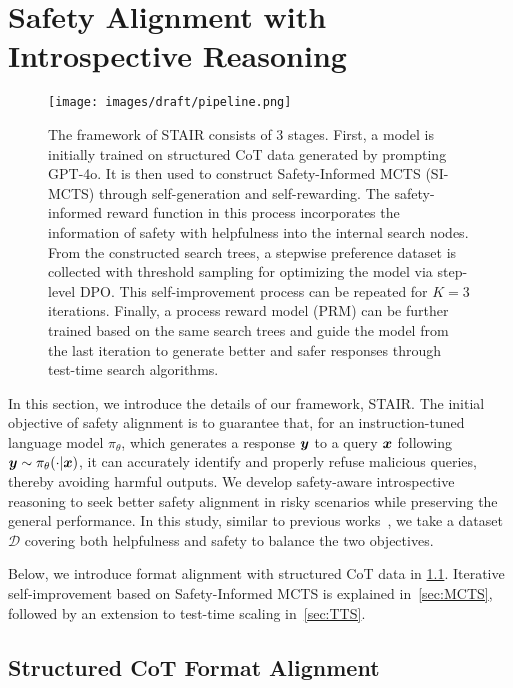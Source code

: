 \section{Safety Alignment with Introspective Reasoning}


\begin{figure*}
    \centering
    \texttt{[image: images/draft/pipeline.png]}
    \vspace{-3ex}
    \caption{The framework of STAIR consists of 3 stages. First, a model is initially trained on structured CoT data generated by prompting GPT-4o. It is then used to construct Safety-Informed MCTS (SI-MCTS) through self-generation and self-rewarding. The safety-informed reward function in this process incorporates the information of safety with helpfulness into the internal search nodes. From the constructed search trees, a stepwise preference dataset is collected with threshold sampling for optimizing the model via step-level DPO. This self-improvement process can be repeated for $K=3$ iterations. Finally, a process reward model (PRM) can be further trained based on the same search trees and guide the model from the last iteration to generate better and safer responses through test-time search algorithms.}
    \label{fig:framework}
\end{figure*}

In this section, we introduce the details of our framework, STAIR. The initial objective of safety alignment is to guarantee that, for an instruction-tuned language model $\pi_\theta$, which generates a response $\boldsymbol{y}$ to a query $\boldsymbol{x}$ following $\boldsymbol{y}\sim\pi_\theta(\cdot|\boldsymbol{x})$, it can accurately identify and properly refuse malicious queries, thereby avoiding harmful outputs. We develop safety-aware introspective reasoning to seek better safety alignment in risky scenarios while preserving the general performance. In this study, similar to previous works~\cite{qi2024safety,weiassessing}, we take a dataset $\mathcal{D}$ covering both helpfulness and safety to balance the two objectives. 



Below, we introduce format alignment with structured CoT data in \cref{sec:SFT}. Iterative self-improvement based on Safety-Informed MCTS is explained in~\cref{sec:MCTS}, followed by an extension to test-time scaling in~\cref{sec:TTS}.


\subsection{Structured CoT Format Alignment}
\label{sec:SFT}



